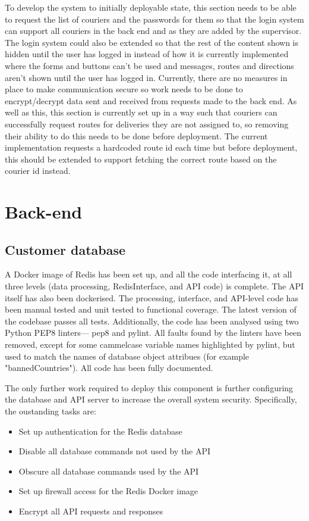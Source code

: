 To develop the system to initially deployable state, this section needs to be able to request the list of couriers and the passwords for them so that the login system can support all couriers in the back end and as they are added by the supervisor. The login system could also be extended so that the rest of the content shown is hidden until the user has logged in instead of how it is currently implemented where the forms and buttons can’t be used and messages, routes and directions aren’t shown until the user has logged in. Currently, there are no measures in place to make communication secure so work needs to be done to encrypt/decrypt data sent and received from requests made to the back end. As well as this, this section is currently set up in a way such that couriers can successfully request routes for deliveries they are not assigned to, so removing their ability to do this needs to be done before deployment. The current implementation requests a hardcoded route id each time but before deployment, this should be extended to support fetching the correct route based on the courier id instead.
\section{Back-end}
\subsection{Customer database}
A Docker image of Redis has been set up, and all the code interfacing it, at all three levels (data processing, RedisInterface, and API code) is complete. The API itself has also been dockerised. The processing, interface, and API-level code has been manual tested and unit tested to functional coverage. The latest version of the codebase passes all tests. Additionally, the code has been analysed using two Python PEP8 linters--- pep8 and pylint. All faults found by the linters have been removed, except for some cammelcase variable names highlighted by pylint, but used to match the names of database object attribues (for example "bannedCountries"). All code has been fully documented.

The only further work required to deploy this component is further configuring the database and API server to increase the overall system security. Specifically, the oustanding tasks are:

\begin{itemize}
    \item Set up authentication for the Redis database
    \item Disable all database commands not used by the API
    \item Obscure all database commands used by the API
    \item Set up firewall access for the Redis Docker image
    \item Encrypt all API requests and responses
\end{itemize}

